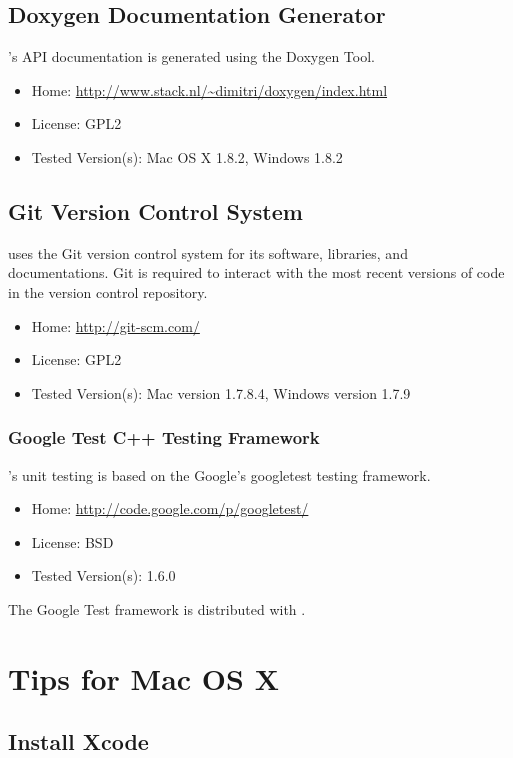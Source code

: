 \subsection{Doxygen Documentation Generator}

\Stan's API documentation is generated using the Doxygen Tool.
%
\begin{itemize}
\item Home: \url{http://www.stack.nl/~dimitri/doxygen/index.html}
\item License: GPL2
\item Tested Version(s): Mac OS X 1.8.2, Windows 1.8.2
\end{itemize}


\subsection{Git Version Control System}

\Stan uses the Git version control system for its software, libraries,
and documentations.  Git is required to interact with the most recent
versions of code in the version control repository.
% 
\begin{itemize}
\item Home: \url{http://git-scm.com/}
\item License: GPL2
\item Tested Version(s): Mac version 1.7.8.4, Windows version 1.7.9
\end{itemize}


\subsubsection{Google Test C++ Testing Framework}

\Stan's unit testing is based on the Google's googletest \Cpp testing
framework.  
%
\begin{itemize}
\item
Home: \url{http://code.google.com/p/googletest/}
\item
License: BSD
\item
Tested Version(s): 1.6.0
\end{itemize}
%
The Google Test framework is distributed with \Stan.


\section{Tips for Mac OS X}

\subsection{Install Xcode}

